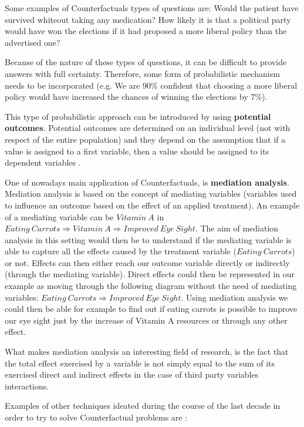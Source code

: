 Some examples of Counterfactuals types of questions are: Would the patient have survived whiteout taking any medication? How likely it is that a political party would have won the elections if it had proposed a more liberal policy than the advertised one? 

Because of the nature of these types of questions, it can be difficult to provide answers with full certainty. Therefore, some form of probabilistic mechanism needs to be incorporated (e.g. We are 90\% confident that choosing a more liberal policy would have increased the chances of winning the elections by 7\%).

This type of probabilistic approach can be introduced by using \textbf{potential outcomes}. Potential outcomes are determined on an individual level (not with respect of the entire population) and they depend on the assumption that if a value is assigned to a first variable, then a value should be assigned to its dependent variables \cite{why}.

One of nowadays main application of Counterfactuals, is \textbf{mediation analysis}. Mediation analysis is based on the concept of mediating variables (variables used to influence an outcome based on the effect of an applied treatment). An example of a mediating variable can be $Vitamin\:A$ in $Eating\:Carrots \Rightarrow Vitamin\:A \Rightarrow Improved\:Eye\:Sight$. The aim of mediation analysis in this setting would then be to understand if the mediating variable is able to capture all the effects caused by the treatment variable ($Eating\:Carrots$) or not. Effects can then either reach our outcome variable directly or indirectly (through the mediating variable). Direct effects could then be represented in our example as moving through the following diagram without the need of mediating variables: $Eating\:Carrots \Rightarrow Improved\:Eye\:Sight$. Using mediation analysis we could then be able for example to find out if eating carrots is possible to improve our eye sight just by the increase of Vitamin A resources or through any other effect.

What makes mediation analysis an interesting field of research, is the fact that the total effect exercised by a variable is not simply equal to the sum of its exercised direct and indirect effects in the case of third party variables interactions.

Examples of other techniques ideated during the course of the last decade in order to try to solve Counterfactual problems are \cite{eva}:

